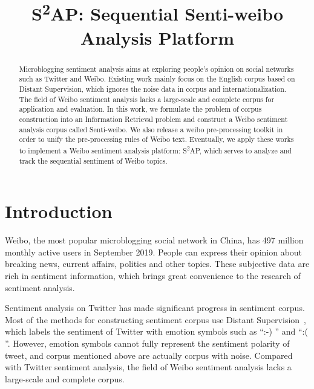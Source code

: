 \documentclass[runningheads]{llncs}
\begin{document}
%
\title{S\textsuperscript{2}AP: Sequential Senti-weibo Analysis Platform}
%
%
\maketitle              %
%
\begin{abstract}
Microblogging sentiment analysis aims at exploring people's opinion on social networks such as Twitter and Weibo. Existing work mainly focus on the English corpus based on Distant Supervision, which ignores the noise data in corpus and internationalization. The field of Weibo sentiment analysis lacks a large-scale and complete corpus for application and evaluation. In this work, we formulate the problem of corpus construction into an Information Retrieval problem and construct a Weibo sentiment analysis corpus called Senti-weibo. We also release a weibo pre-processing toolkit in order to unify the pre-processing rules of Weibo text. Eventually, we apply these works to implement a Weibo sentiment analysis platform: S\textsuperscript{2}AP, which serves to analyze and track the sequential sentiment of Weibo topics.


\end{abstract}

\section{Introduction}
Weibo, the most popular microblogging social network in China, has 497 million monthly active users in September 2019. People can express their opinion about breaking news, current affairs, politics and other topics. These subjective data are rich in sentiment information, which brings great convenience to the research of sentiment analysis.

Sentiment analysis on Twitter has made significant progress in sentiment corpus. Most of the methods for constructing sentiment corpus use Distant Supervision~\cite{go2009twitter}, which labels the sentiment of Twitter with emotion symbols such as ``:-) '' and ``:( ''. However, emotion symbols cannot fully represent the sentiment polarity of tweet, and corpus mentioned above are actually corpus with noise. Compared with Twitter sentiment analysis, the field of Weibo sentiment analysis lacks a large-scale and complete corpus.
\end{document}
